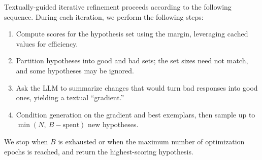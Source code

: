 \documentclass{article}
\theoremstyle{plain}
\theoremstyle{definition}
\theoremstyle{remark}
\newcommand{\method}{SAGE} %
\newcommand{\budget}{B}
\newcommand{\batchN}{N}
\begin{document}

Textually-guided iterative refinement proceeds according to the following sequence. During each iteration, we perform the following steps:
\begin{enumerate}
    \item Compute scores for the hypothesis set using the margin, leveraging cached values for efficiency.
    \item Partition hypotheses into good and bad sets; the set sizes need not match, and some hypotheses may be ignored.
    \item Ask the LLM to summarize changes that would turn bad responses into good ones, yielding a textual ``gradient.''
    \item Condition generation on the gradient and best exemplars, then sample up to \(\min(\batchN,\ \budget-\text{spent})\) new hypotheses.
\end{enumerate}
We stop when \(\budget\) is exhausted or when the maximum number of optimization epochs is reached, and return the highest-scoring hypothesis.

\end{document}
